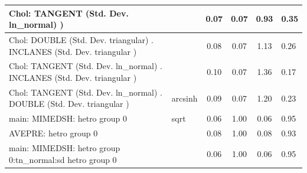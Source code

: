 \begin{table}
\begin{center}
\begin{tabular}{|l|l|c|c|c|l|}
			\hline
			 Chol: TANGENT (Std. Dev. ln_normal) ) &  & 0.07 & 0.07 & 0.93 & 0.35 \\
			\hline
			 Chol: DOUBLE (Std. Dev. triangular) . INCLANES (Std. Dev.   triangular ) &  & 0.08 & 0.07 & 1.13 & 0.26 \\
			\hline
			 Chol: TANGENT (Std. Dev. ln_normal) . INCLANES (Std. Dev.   triangular ) &  & 0.10 & 0.07 & 1.36 & 0.17 \\
			\hline
			 Chol: TANGENT (Std. Dev. ln_normal) . DOUBLE (Std. Dev.   triangular ) & arcsinh & 0.09 & 0.07 & 1.20 & 0.23 \\
			\hline
			main: MIMEDSH: hetro group 0 & sqrt & 0.06 & 1.00 & 0.06 & 0.95 \\
			\hline
			AVEPRE: hetro group 0 &  & 0.08 & 1.00 & 0.08 & 0.93 \\
			\hline
			main: MIMEDSH: hetro group 0:tn_normal:sd  hetro group 0 &  & 0.06 & 1.00 & 0.06 & 0.95 \\
			\hline
		\end{tabular}
	\end{center}
\end{table}